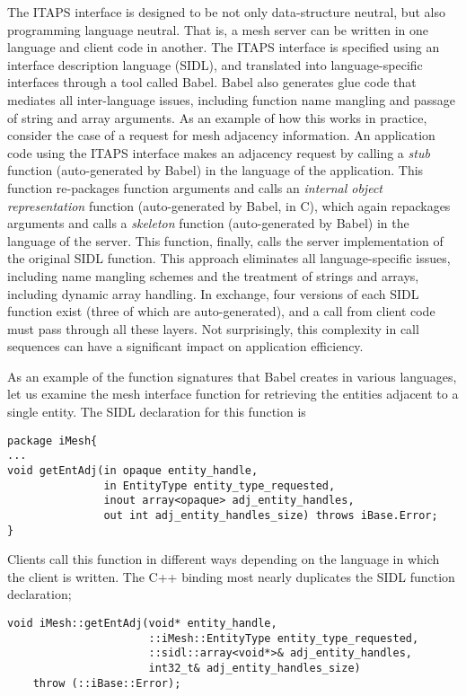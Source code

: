 The ITAPS interface is designed to be not only data-structure neutral,
but also programming language neutral. That is, a mesh server can be
written in one language and client code in another. The ITAPS interface
is specified using an interface description language (SIDL), and
translated into language-specific interfaces through a tool called
Babel.\cite{babel,babel:site04} Babel also generates glue code that
mediates all inter-language issues, including function name mangling and
passage of string and array arguments.  As an example of how this works
in practice, consider the case of a request for mesh adjacency
information. An application code using the ITAPS interface makes an
adjacency request by calling a \emph{stub} function (auto-generated by
Babel) in the language of the application.  This function re-packages
function arguments and calls an \emph{internal object representation}
function (auto-generated by Babel, in C), which again repackages
arguments and calls a \emph{skeleton} function (auto-generated by Babel)
in the language of the server. This function, finally, calls the server
implementation of the original SIDL function. This approach eliminates
all language-specific issues, including name mangling schemes and the
treatment of strings and arrays, including dynamic array handling.  In
exchange, four versions of each SIDL function exist (three of which are
auto-generated), and a call from client code must pass through all these
layers. Not surprisingly, this complexity in call sequences can have a
significant impact on application efficiency.

As an example of the function signatures that Babel creates in various
languages, let us examine the mesh interface function for retrieving the
entities adjacent to a single entity.  The SIDL declaration for this
function is

\begin{verbatim}
package iMesh{
...
void getEntAdj(in opaque entity_handle,
               in EntityType entity_type_requested,
               inout array<opaque> adj_entity_handles,
               out int adj_entity_handles_size) throws iBase.Error;
}
\end{verbatim}

Clients call this function in different ways depending on the language
in which the client is written.  The C++ binding most nearly
duplicates the SIDL function declaration;
 
\begin{verbatim}
void iMesh::getEntAdj(void* entity_handle,
                      ::iMesh::EntityType entity_type_requested,
                      ::sidl::array<void*>& adj_entity_handles,
                      int32_t& adj_entity_handles_size)
    throw (::iBase::Error);
\end{verbatim}

